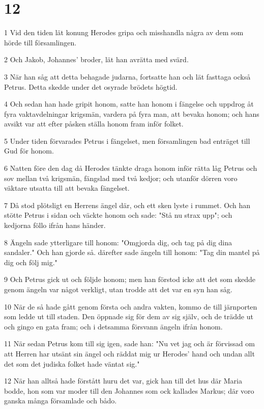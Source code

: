 \chapter{12}

\par 1 Vid den tiden lät konung Herodes gripa och misshandla några av dem som hörde till församlingen.
\par 2 Och Jakob, Johannes' broder, lät han avrätta med svärd.
\par 3 När han såg att detta behagade judarna, fortsatte han och lät fasttaga också Petrus. Detta skedde under det osyrade brödets högtid.
\par 4 Och sedan han hade gripit honom, satte han honom i fängelse och uppdrog åt fyra vaktavdelningar krigsmän, vardera på fyra man, att bevaka honom; och hans avsikt var att efter påsken ställa honom fram inför folket.
\par 5 Under tiden förvarades Petrus i fängelset, men församlingen bad enträget till Gud för honom.
\par 6 Natten före den dag då Herodes tänkte draga honom inför rätta låg Petrus och sov mellan två krigsmän, fängslad med två kedjor; och utanför dörren voro väktare utsatta till att bevaka fängelset.
\par 7 Då stod plötsligt en Herrens ängel där, och ett sken lyste i rummet. Och han stötte Petrus i sidan och väckte honom och sade: "Stå nu strax upp"; och kedjorna föllo ifrån hans händer.
\par 8 Ängeln sade ytterligare till honom: "Omgjorda dig, och tag på dig dina sandaler." Och han gjorde så. därefter sade ängeln till honom: "Tag din mantel på dig och följ mig."
\par 9 Och Petrus gick ut och följde honom; men han förstod icke att det som skedde genom ängeln var något verkligt, utan trodde att det var en syn han såg.
\par 10 När de så hade gått genom första och andra vakten, kommo de till järnporten som ledde ut till staden. Den öppnade sig för dem av sig själv, och de trädde ut och gingo en gata fram; och i detsamma försvann ängeln ifrån honom.
\par 11 När sedan Petrus kom till sig igen, sade han: "Nu vet jag och är förvissad om att Herren har utsänt sin ängel och räddat mig ur Herodes' hand och undan allt det som det judiska folket hade väntat sig."
\par 12 När han alltså hade förstått huru det var, gick han till det hus där Maria bodde, hon som var moder till den Johannes som ock kallades Markus; där voro ganska många församlade och bådo.
